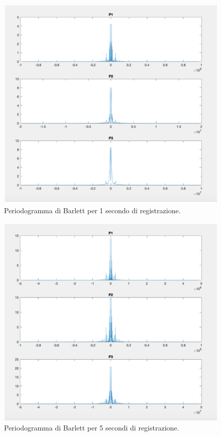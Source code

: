 \begin{minipage}[t]{.45\textwidth}
	\begin{figure}[H]
		\includegraphics[width=\textwidth]{./images/cap4/barlett1s.png}
		\caption{Periodogramma di Barlett per 1 secondo di registrazione.}
	\end{figure}
\end{minipage}
\hfill
\begin{minipage}[t]{.45\textwidth}
	\begin{figure}[H]
		\includegraphics[width=\textwidth]{./images/cap4/barlett5s.png}
		\caption{Periodogramma di Barlett per 5 secondi di registrazione.}
	\end{figure}
\end{minipage}

